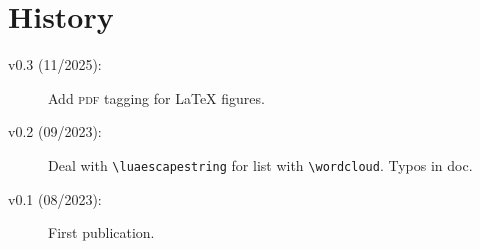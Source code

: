 \documentclass[english]{ltxdoc}
\begin{document}
\section{History}

\begin{description}
  \item[v0.3 (11/2025):] Add \textsc{pdf} tagging for \LaTeX{} figures. 
  \item[v0.2 (09/2023):] Deal with \lstinline+\luaescapestring+ for list with
  \lstinline+\wordcloud+. Typos in doc. 
  \item[v0.1 (08/2023):] First publication.
\end{description}
\printbibliography
\printindex
\newpage
\end{document}
